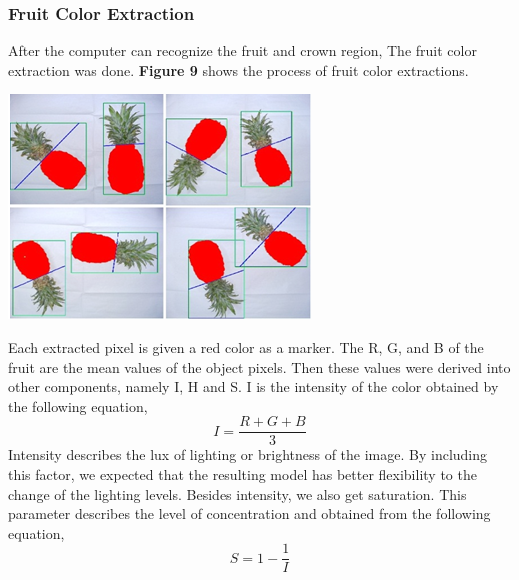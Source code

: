 \documentclass[11pt]{article}
\begin{document}
\begin{linenumbers}
\subsubsection{Fruit Color Extraction}
After the computer can recognize the fruit and crown region, The fruit color extraction was done. \textbf {Figure 9} shows the process of fruit color extractions.
\begin{center}
	\includegraphics[scale=0.73]{images/color-extraction}
\end{center}
Each extracted pixel is given a red color as a marker. The R, G, and B of the fruit are the mean values of the object pixels. Then these values were derived into other components, namely I, H and S. I is the intensity of the color obtained by the following equation,
\begin{equation}
	I = \frac{R + G + B}{3}
\end{equation}
Intensity describes the lux of lighting or brightness of the image. By including this factor, we expected that the resulting model has better flexibility to the change of the lighting levels. Besides intensity, we also get saturation. This parameter describes the level of concentration and  obtained from the following equation,
\begin{equation}
	S = 1- \frac{1}{I}
\end{equation}


\end{linenumbers}
\end{document}
